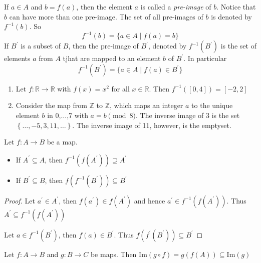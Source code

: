 If $ a \in A $ and $ b = f(a) $, then the element $a$ is called a \emph{pre-image}
of $b$. Notice that $b$ can have more than one pre-image. The set of all pre-images
of $b$ is denoted by $ f^{-1}(b) $. So
$$ f^{-1}(b) =  \{a \in A \mid f(a) = b\}$$
If $B^\prime$ is a subset of $B$, then the pre-image of $B^\prime$, denoted by
$ f^{-1}(B^\prime) $ is the set of elements $a$ from $A$ tjhat are mapped to
an element $b$ of $B^\prime$. In particular
$$ f^{-1}(B^\prime) = \{a \in A \mid f(a) \in B^\prime\} $$

\begin{example}
    \begin{enumerate}
        \item Let $ f:\mathbb{R} \to \mathbb{R} $ with $ f(x) = x^2 $
        for all $ x \in \mathbb{R} $. Then $ f^{-1}(\left[0,4\right]) = \left[-2,2\right] $
        \item Consider the map from $ \mathbb{Z} $ to $ \mathbb{Z} $, which
        maps an integer $a$ to the unique element $b$ in {0,$\dots$,7} with
        $ a=b \pmod{8} $. The inverse image of 3 is the set $\left\{\dots, -5,3, 11, \dots\right\} $.
        The inverse image of 11, however, is the emptyset.
    \end{enumerate}
\end{example}

\newpage
\begin{theorem}
    Let $ f: A \to B $ be a map.
    \begin{itemize}
        \item If $ A^\prime \subseteq A $, then $ f^{-1}(f(A^\prime)) \supseteq A^\prime $
        \item If $ B^\prime \subseteq B $, then $ f(f^{-1}(B^\prime)) \subseteq B^\prime $
    \end{itemize}
\end{theorem}

\begin{proof}[Proof]
    Let $ a^\prime \in A^\prime $, then $ f(a^\prime) \in f(A^\prime) $ and hence
    $ a^\prime \in f^{-1}(f(A^\prime)) $. Thus $ A^\prime \subseteq f^{-1}(f(A^\prime)) $

    Let $ a \in f^{-1}(B^\prime) $, then $ f(a) \in B^\prime $. Thus
    $ f(f^\prime(B^\prime)) \subseteq B^\prime $
\end{proof}

\begin{theorem}
    Let $ f: A \to B $ and $ g: B \to C $ be maps. Then
    $ \text{Im}(g \circ f) = g(f(A)) \subseteq \text{Im}(g) $
\end{theorem}

